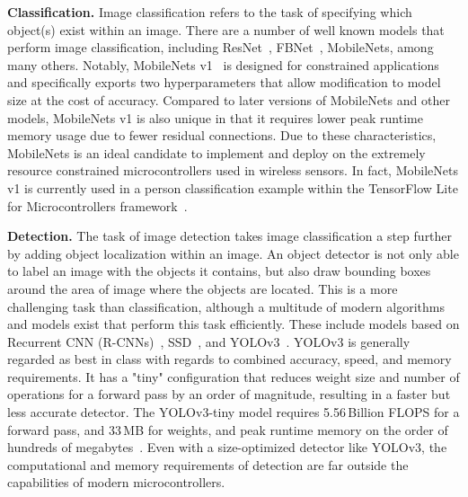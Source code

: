 \textbf{Classification.}
Image classification refers to the task of specifying which object(s) exist within an image. There are a number of well known models that perform image classification, including ResNet~\cite{he2016deep}, FBNet~\cite{wu2019fbnet}, MobileNets\cite{howard2019searching}, among many others. Notably, MobileNets v1~\cite{howard2017mobilenets} is designed for constrained applications and specifically exports two hyperparameters that allow modification to model size at the cost of accuracy. Compared to later versions of MobileNets and other models, MobileNets v1 is also unique in that it requires lower peak runtime memory usage due to fewer residual connections. Due to these characteristics, MobileNets is an ideal candidate to implement and deploy on the extremely resource constrained microcontrollers used in wireless sensors. In fact, MobileNets v1 is currently used in a person classification example within the TensorFlow Lite for Microcontrollers framework~\cite{tflm}.

\textbf{Detection.}
The task of image detection takes image classification a step further by adding object localization within an image. An object detector is not only able to label an image with the objects it contains, but also draw bounding boxes around the area of image where the objects are located. This is a more challenging task than classification, although a multitude of modern algorithms and models exist that perform this task efficiently. These include models based on Recurrent CNN (R-CNNs)~\cite{dai2016r}, SSD~\cite{liu2016ssd}, and YOLOv3~\cite{redmon2018yolov3}. YOLOv3 is generally regarded as best in class with regards to combined accuracy, speed, and memory requirements. It has a "tiny" configuration that reduces weight size and number of operations for a forward pass by an order of magnitude, resulting in a faster but less accurate detector. The YOLOv3-tiny model requires 5.56\,Billion FLOPS for a forward pass, and 33\,MB for weights, and peak runtime memory on the order of hundreds of megabytes~\cite{yolowebsite}. Even with a size-optimized detector like YOLOv3, the computational and memory requirements of detection are far outside the capabilities of modern microcontrollers.

